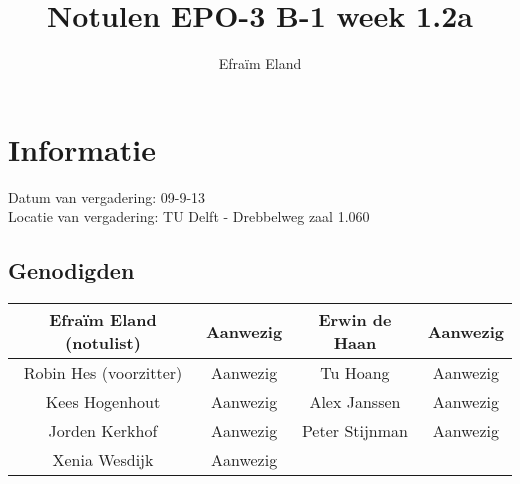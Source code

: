 \documentclass{article}
\begin{document}
\title{Notulen EPO-3 B-1 week 1.2a }%
\author{Efra\"im Eland}%
\maketitle

\section*{Informatie}
Datum van vergadering: 09-9-13\\ %
Locatie van vergadering: TU Delft - Drebbelweg zaal 1.060 %
\subsection*{Genodigden}
\begin{center}
\begin{tabular}{|c |c | c| c|}
	\hline
Efraïm Eland (notulist) & Aanwezig & Erwin de Haan & Aanwezig \\
	\hline
Robin Hes (voorzitter) & Aanwezig & Tu Hoang & Aanwezig \\
	\hline
Kees Hogenhout & Aanwezig & Alex Janssen & Aanwezig\\
	\hline
Jorden Kerkhof & Aanwezig & Peter Stijnman & Aanwezig \\
	\hline
Xenia Wesdijk & Aanwezig & & \\
	\hline
\end{tabular}
\end{center}
\end{document}
